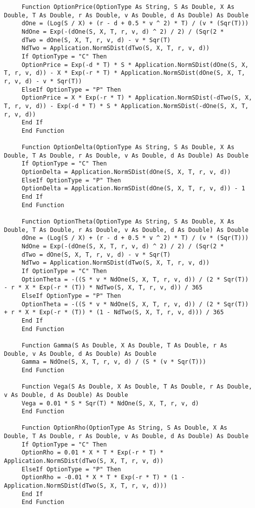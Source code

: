 \documentclass[letterpaper]{article}
\begin{document}
  \begin{lstlisting}
     Function OptionPrice(OptionType As String, S As Double, X As Double, T As Double, r As Double, v As Double, d As Double) As Double
     dOne = (Log(S / X) + (r - d + 0.5 * v ^ 2) * T) / (v * (Sqr(T)))
     NdOne = Exp(-(dOne(S, X, T, r, v, d) ^ 2) / 2) / (Sqr(2 * 
     dTwo = dOne(S, X, T, r, v, d) - v * Sqr(T)
     NdTwo = Application.NormSDist(dTwo(S, X, T, r, v, d))
     If OptionType = "C" Then
     OptionPrice = Exp(-d * T) * S * Application.NormSDist(dOne(S, X, T, r, v, d)) - X * Exp(-r * T) * Application.NormSDist(dOne(S, X, T, r, v, d) - v * Sqr(T))
     ElseIf OptionType = "P" Then
     OptionPrice = X * Exp(-r * T) * Application.NormSDist(-dTwo(S, X, T, r, v, d)) - Exp(-d * T) * S * Application.NormSDist(-dOne(S, X, T, r, v, d))
     End If
     End Function
     
     Function OptionDelta(OptionType As String, S As Double, X As Double, T As Double, r As Double, v As Double, d As Double) As Double
     If OptionType = "C" Then
     OptionDelta = Application.NormSDist(dOne(S, X, T, r, v, d))
     ElseIf OptionType = "P" Then
     OptionDelta = Application.NormSDist(dOne(S, X, T, r, v, d)) - 1
     End If
     End Function
     
     Function OptionTheta(OptionType As String, S As Double, X As Double, T As Double, r As Double, v As Double, d As Double) As Double
     dOne = (Log(S / X) + (r - d + 0.5 * v ^ 2) * T) / (v * (Sqr(T)))
     NdOne = Exp(-(dOne(S, X, T, r, v, d) ^ 2) / 2) / (Sqr(2 * 
     dTwo = dOne(S, X, T, r, v, d) - v * Sqr(T)
     NdTwo = Application.NormSDist(dTwo(S, X, T, r, v, d))
     If OptionType = "C" Then
     OptionTheta = -((S * v * NdOne(S, X, T, r, v, d)) / (2 * Sqr(T)) - r * X * Exp(-r * (T)) * NdTwo(S, X, T, r, v, d)) / 365
     ElseIf OptionType = "P" Then
     OptionTheta = -((S * v * NdOne(S, X, T, r, v, d)) / (2 * Sqr(T)) + r * X * Exp(-r * (T)) * (1 - NdTwo(S, X, T, r, v, d))) / 365
     End If
     End Function
     
     Function Gamma(S As Double, X As Double, T As Double, r As Double, v As Double, d As Double) As Double
     Gamma = NdOne(S, X, T, r, v, d) / (S * (v * Sqr(T)))
     End Function
     
     Function Vega(S As Double, X As Double, T As Double, r As Double, v As Double, d As Double) As Double
     Vega = 0.01 * S * Sqr(T) * NdOne(S, X, T, r, v, d)
     End Function
     
     Function OptionRho(OptionType As String, S As Double, X As Double, T As Double, r As Double, v As Double, d As Double) As Double
     If OptionType = "C" Then
     OptionRho = 0.01 * X * T * Exp(-r * T) * Application.NormSDist(dTwo(S, X, T, r, v, d))
     ElseIf OptionType = "P" Then
     OptionRho = -0.01 * X * T * Exp(-r * T) * (1 - Application.NormSDist(dTwo(S, X, T, r, v, d)))
     End If
     End Function
\end{lstlisting}
	 
\end{document}
